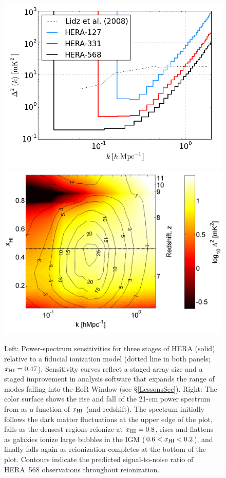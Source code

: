 \documentclass[preprint]{aastex}
\def\HI{{H{\small I }}}
\def\xHI{{x_{\rm\HI}}}
\begin{document}
\begin{figure}[t]\centering
\includegraphics[height=2.40 in]{plots/eor_pspec.png}
\includegraphics[height=2.45 in]{plots/hera_snr_contour.png} 
\caption{\small 
Left: Power-spectrum sensitivities for three stages of
HERA (solid) relative to a fiducial ionization model (dotted line in both panels; $\xHI=0.47$).  
Sensitivity curves reflect a staged array size and
a staged improvement in analysis software that expands the range
of modes falling into the EoR Window (see \S\ref{LessonsSec}).
Right: The color surface shows the rise and fall of the 21-cm power spectrum from 
\citealt{lidz_et_al2008} as a function of $\xHI$ (and redshift).
The spectrum initially follows the dark matter fluctuations at the upper edge
of the plot, falls as the densest regions reionize at $\xHI=0.8$, rises and flattens as galaxies ionize large bubbles in the IGM
($0.6<\xHI<0.2$), and finally
falls again as reionization completes at the bottom of the
plot. Contours indicate the predicted signal-to-noise ratio of HERA~568 observations
throughout reionization.
}\label{fig:eor_pspec} 
\end{figure}
\end{document}
